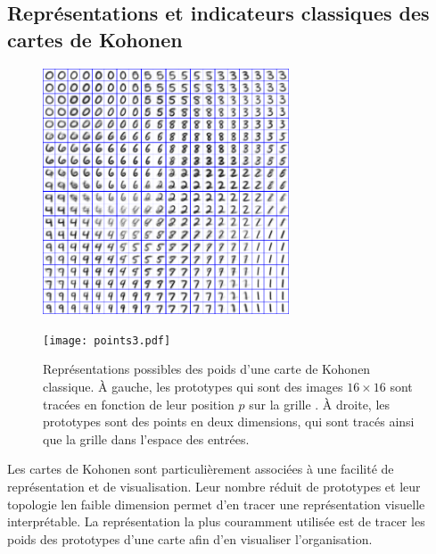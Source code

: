 \documentclass[../main]{subfiles}
\begin{document}
\subsection{Représentations et indicateurs classiques des cartes de Kohonen}
\begin{figure}[t]
    \begin{minipage}{0.5\textwidth}
    \centering
    \includegraphics[width=0.65\textwidth]{digits.jpg}
    \end{minipage}
    \begin{minipage}{0.5\textwidth}
    \centering
    \texttt{[image: points3.pdf]}
    \end{minipage}
    \caption[Représentations classiques des poids d'une carte de Kohonen]{\label{fig:representation} Représentations possibles des poids d'une carte de Kohonen classique. \`A gauche, les prototypes qui sont des images $16\times 16$ sont tracées en fonction de leur position $p$ sur la grille \footnotemark[1]. \`A droite, les prototypes sont des points en deux dimensions, qui sont tracés ainsi que la grille dans l'espace des entrées.}
    \end{figure}
Les cartes de Kohonen sont particulièrement associées à une facilité de représentation et de visualisation. Leur nombre réduit de prototypes et leur topologie len faible dimension permet d'en tracer une représentation visuelle interprétable.
La représentation la plus couramment utilisée est de tracer les poids des prototypes d'une carte afin d'en visualiser l'organisation.
\end{document}
